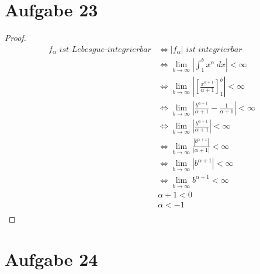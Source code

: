 \documentclass[10pt,a4paper]{article}
\begin{document}
\section{Aufgabe 23}
\begin{proof}
  \begin{align*}
    f_{\alpha}\textit{ ist Lebesgue-integrierbar} & \Leftrightarrow |f_{\alpha}| \textit{ ist integrierbar}\\
    & \Leftrightarrow \lim_{b \rightarrow \infty} |\int_{1}^{b} x^{\alpha}\ dx| < \infty\\
    & \Leftrightarrow \lim_{b \rightarrow \infty} |\left[ \frac{x^{\alpha + 1}}{\alpha + 1} \right]_{1}^{b}| < \infty\\
    & \Leftrightarrow \lim_{b \rightarrow \infty} |\frac{b^{\alpha + 1}}{\alpha + 1} - \frac{1}{\alpha + 1}| < \infty\\
    & \Leftrightarrow \lim_{b \rightarrow \infty} |\frac{b^{\alpha + 1}}{\alpha + 1}| < \infty\\
    & \Leftrightarrow \lim_{b \rightarrow \infty} \frac{|b^{\alpha + 1}|}{|\alpha + 1|} < \infty\\
    & \Leftrightarrow \lim_{b \rightarrow \infty} |b^{\alpha + 1}| < \infty\\
    & \Leftrightarrow \lim_{b \rightarrow \infty} b^{\alpha + 1} < \infty\\
    & \alpha + 1 < 0\\
    & \alpha < -1\\
  \end{align*}
\end{proof}

\section{Aufgabe 24}
\end{document}
